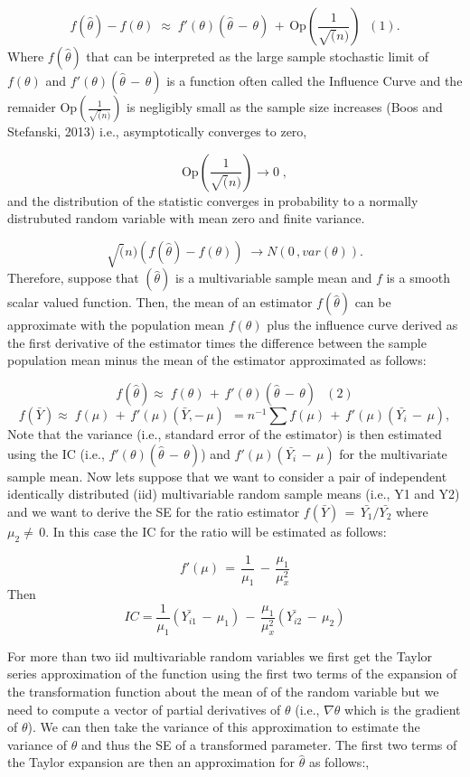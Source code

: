 \documentclass[]{article}
\begin{document}
\[f(\hat\theta)-f(\theta)\;\approx\;f'(\theta)(\hat\theta\,-\,\theta)\,+\,\text{Op}(\frac{1}{\sqrt(n)}) \;\;(1).\]
Where \(f(\hat\theta)\) that can be interpreted as the large sample
stochastic limit of \(f(\theta)\) and
\(f'(\theta)(\hat\theta\,-\,\theta)\) is a function often called the
Influence Curve and the remaider \(\text{Op}(\frac{1}{\sqrt(n)})\) is
negligibly small as the sample size increases (Boos and Stefanski, 2013)
i.e., asymptotically converges to zero,

\[\text{Op}(\frac{1}{\sqrt(n)}) \rightarrow 0 \;,\] and the distribution
of the statistic converges in probability to a normally distrubuted
random variable with mean zero and finite variance.

\[\sqrt(n)\left(f(\hat\theta)-f(\theta)\right)\; \rightarrow N(0\,,var(\theta)).\]
Therefore, suppose that \((\hat\theta)\) is a multivariable sample mean
and \(f\) is a smooth scalar valued function. Then, the mean of an
estimator \(f(\hat\theta)\) can be approximate with the population mean
\(f(\theta)\) plus the influence curve derived as the first derivative
of the estimator times the difference between the sample population mean
minus the mean of the estimator approximated as follows:

\[f(\hat\theta)\approx\;f(\theta)\,+\,f'(\theta)(\hat\theta\,-\,\theta)\, \;\;(2)\]
\[f(\bar{Y})\approx\;f(\mu)\,+\,f'(\mu)(\bar{Y},-\,\mu)\, \;= n^{-1}\sum{f(\mu)\,+\,f'(\mu)(\bar{Y_{i}}\,-\,\mu)},\]
Note that the variance (i.e., standard error of the estimator) is then
estimated using the IC (i.e., \(f'(\theta)(\hat\theta\,-\,\theta)\)) and
\(f'(\mu)(\bar{Y_{i}}\,-\,\mu)\) for the multivariate sample mean. Now
lets suppose that we want to consider a pair of independent identically
distributed (iid) multivariable random sample means (i.e., Y1 and Y2)
and we want to derive the SE for the ratio estimator
\(f(\bar{Y})\,=\,\bar{Y_{1}}/\bar{Y_{2}}\) where \(\mu_{2}\neq\,0\). In
this case the IC for the ratio will be estimated as follows:

\[f'(\mu)\,=\, \frac{1}{\mu_{1}}\,-\,\frac{\mu_{1}}{\mu_{x}^{2}}\] Then
\[IC = \frac{1}{\mu_{1}}{}(\bar{Y_{i1}}\,-\,\mu_{1})\,-\,\frac{\mu_{1}}{\mu_{x}^{2}}(\bar{Y_{i2}}\,-\,\mu_{2})\]

For more than two iid multivariable random variables we first get the
Taylor series approximation of the function using the first two terms of
the expansion of the transformation function about the mean of of the
random variable but we need to compute a vector of partial derivatives
of \(\theta\) (i.e., \(\nabla \theta\) which is the gradient of
\(\theta\)). We can then take the variance of this approximation to
estimate the variance of \(\theta\) and thus the SE of a transformed
parameter. The first two terms of the Taylor expansion are then an
approximation for \(\hat\theta\) as follows:,
\end{document}
